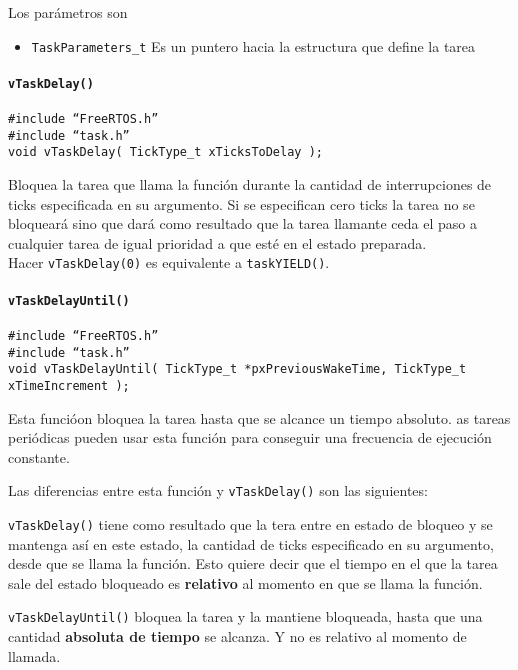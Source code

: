 Los parámetros son
\begin{itemize}
    \item \texttt{TaskParameters\_t} Es un puntero hacia la estructura que define la tarea
\end{itemize}


\paragraph{\texttt{vTaskDelay()}}

\begin{verbatim}
#include “FreeRTOS.h”
#include “task.h”
void vTaskDelay( TickType_t xTicksToDelay );
\end{verbatim}


Bloquea la tarea que llama la función durante la cantidad de interrupciones de ticks especificada en su argumento. Si se especifican cero ticks la tarea no se bloqueará sino que dará como resultado que la tarea llamante ceda el paso a cualquier tarea de igual prioridad a que esté en el estado preparada.\\

Hacer \texttt{vTaskDelay(0)} es equivalente a \texttt{taskYIELD()}.


\paragraph{\texttt{vTaskDelayUntil()}}

\begin{verbatim}
#include “FreeRTOS.h”
#include “task.h”
void vTaskDelayUntil( TickType_t *pxPreviousWakeTime, TickType_t xTimeIncrement );
\end{verbatim}

Esta funcióon bloquea la tarea hasta que se alcance un tiempo absoluto. as tareas periódicas pueden usar esta función para conseguir una frecuencia de ejecución constante.

Las diferencias entre esta función y \texttt{vTaskDelay()} son las siguientes:

\texttt{vTaskDelay()} tiene como resultado que la tera entre en estado de bloqueo y se mantenga así en este estado, la cantidad de ticks especificado en su argumento, desde que se llama la función. Esto quiere decir que el tiempo en el que la tarea sale del estado bloqueado es \textbf{relativo} al momento en que se llama la función.

\texttt{vTaskDelayUntil()} bloquea la tarea y la mantiene bloqueada, hasta que una cantidad \textbf{absoluta de tiempo} se alcanza. Y no es relativo al momento de llamada.

